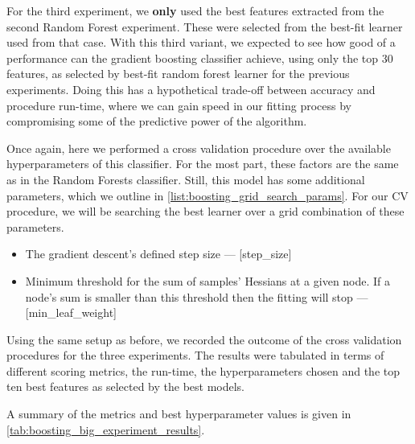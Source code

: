 For the third experiment, we \textbf{only} used the best features extracted from the second Random Forest experiment.
These were selected from the best-fit learner used from that case.
With this third variant, we expected to see how good of a performance can the gradient boosting classifier achieve, using only the top 30 features, as selected by best-fit random forest learner for the previous experiments.
Doing this has a hypothetical trade-off between accuracy and procedure run-time, where we can gain speed in our fitting process by compromising some of the predictive power of the algorithm.

Once again, here we performed a cross validation procedure over the available hyperparameters of this classifier.
For the most part, these factors are the same as in the Random Forests classifier.
Still, this model has some additional parameters, which we outline in \cref{list:boosting_grid_search_params}.
For our CV procedure, we will be searching the best learner over a grid combination of these parameters.

\begin{itemize}

  \item The gradient descent's defined step size  --- [step\_size]
  \item Minimum threshold for the sum of samples' Hessians at a given node.
  If a node's sum is smaller than this threshold then the fitting will stop  --- [min\_leaf\_weight]
\label{list:boosting_grid_search_params}
\end{itemize}


Using the same setup as before, we recorded the outcome of the cross validation procedures for the three experiments.
The results were tabulated in terms of different scoring metrics, the run-time, the hyperparameters chosen and the top ten best features as selected by the best models.

A summary of the metrics and best hyperparameter values is given in \cref{tab:boosting_big_experiment_results}.

